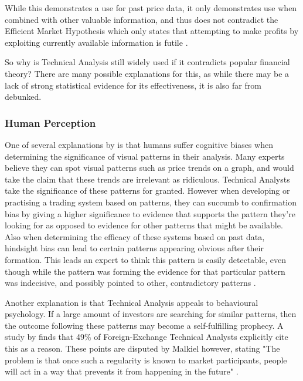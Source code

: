 \documentclass{article}
\begin{document}
While this demonstrates a use for past price data, it only demonstrates use when combined with other valuable information, and thus does not contradict the Efficient Market Hypothesis which only states that attempting to make profits by exploiting currently available information is futile \citep{taprofitability}.

So why is Technical Analysis still widely used if it contradicts popular financial theory? There are many possible explanations for this, as while there may be a lack of strong statistical evidence for its effectiveness, it is also far from debunked. 	

\subsubsection{Human Perception}

One of several explanations by \cite[p.45-71]{aronson2011evidence} is that humans suffer cognitive biases when determining the significance of visual patterns in their analysis. Many experts believe they can spot visual patterns such as price trends on a graph, and would take the claim that these trends are irrelevant as ridiculous. Technical Analysts take the significance of these patterns for granted. However when developing or practising a trading system based on patterns, they can succumb to confirmation bias by giving a higher significance to evidence that supports the pattern they're looking for as opposed to evidence for other patterns that might be available. Also when determining the efficacy of these systems based on past data, hindsight bias can lead to certain patterns appearing obvious after their formation. This leads an expert to think this pattern is easily detectable, even though while the pattern was forming the evidence for that particular pattern was indecisive, and possibly pointed to other, contradictory patterns \cite[p.62]{aronson2011evidence}.

Another explanation is that Technical Analysis appeals to behavioural psychology. If a large amount of investors are searching for similar patterns, then the outcome following these patterns may become a self-fulfilling prophecy. A study by \cite{examininguse1997} finds that 49\% of Foreign-Exchange Technical Analysts explicitly cite this as a reason. These points are disputed by Malkiel however, stating "The problem is that once such a regularity is known to market participants, people will act in a way that prevents it from happening in the future" \cite[p.162]{randomwalk2012}.
\end{document}
